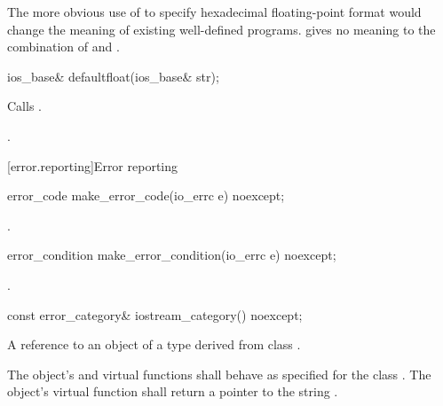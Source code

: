 \pnum
\begin{note} The more obvious use of
 to specify hexadecimal floating-point format would
change the meaning of existing well-defined programs. \CppIII{}
gives no meaning to the combination of  and
.\end{note}

%
\begin{itemdecl}
ios_base& defaultfloat(ios_base& str);
\end{itemdecl}

\begin{itemdescr}
\pnum
\effects
Calls .

\pnum
\returns {}.
\end{itemdescr}

[error.reporting]{Error reporting}

%
\begin{itemdecl}
error_code make_error_code(io_errc e) noexcept;
\end{itemdecl}

\begin{itemdescr}
\pnum
\returns {}.
\end{itemdescr}

%
\begin{itemdecl}
error_condition make_error_condition(io_errc e) noexcept;
\end{itemdecl}

\begin{itemdescr}
\pnum
\returns {}.
\end{itemdescr}

%
\begin{itemdecl}
const error_category& iostream_category() noexcept;
\end{itemdecl}

\begin{itemdescr}
\pnum
\returns A reference to an object of a type derived from class
.

\pnum
The object's  and  virtual functions shall behave as specified for the class . The object's  virtual function shall return a pointer to the string .
\end{itemdescr}


